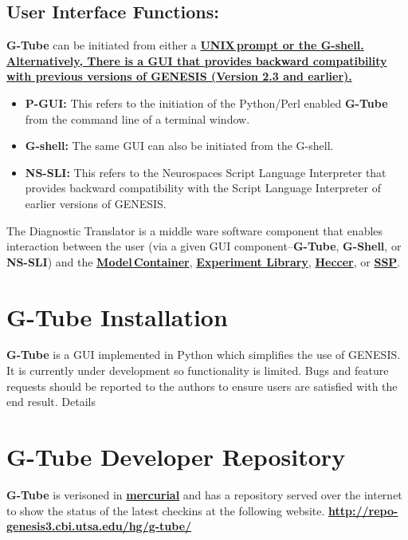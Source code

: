 \documentclass[12pt]{article}
\begin{document}
\subsection*{User Interface Functions:} {\bf G-Tube} can be initiated from either a \href{../unix-linux/unix-linux.tex}\bf {\bf UNIX\,prompt} or the \href{../gshell/gshell.tex}{\bf G-shell}. Alternatively, There is a GUI that provides backward compatibility with previous versions of GENESIS (Version 2.3 and earlier).

\begin{itemize}
   \item {\bf P-GUI:} This refers to the initiation of the Python/Perl enabled {\bf G-Tube} from the command line of a terminal window.
   \item {\bf G-shell:} The same GUI can also be initiated from the G-shell.
   \item {\bf NS-SLI:} This refers to the Neurospaces Script Language Interpreter that provides backward compatibility with the Script Language Interpreter of earlier versions of GENESIS.
\end{itemize}

The Diagnostic Translator is a middle ware software component that enables interaction between the user (via a given GUI component--{\bf G-Tube}, {\bf G-Shell}, or {\bf NS-SLI}) and the \href{../model-container/model-container.tex}{\bf Model\,Container}, \href{../experiment/experiment.tex}{\bf Experiment Library}, \href{../heccer/heccer.tex}{\bf Heccer}, or \href{../ssp/ssp.tex}{\bf SSP}.

\section*{G-Tube Installation}

{\bf G-Tube} is a GUI implemented in Python which simplifies the use of GENESIS. It is currently under development so functionality is limited. Bugs and feature requests should be reported to the authors to ensure users are satisfied with the end result.
Details

\section*{G-Tube Developer Repository}

{\bf G-Tube} is verisoned in \href{http://mercurial.selenic.com/}{\bf mercurial} and has a repository served over the internet to show the status of the latest checkins at the following website. \href{http://repo-genesis3.cbi.utsa.edu/hg/g-tube/}{\bf http://repo-genesis3.cbi.utsa.edu/hg/g-tube/}
\end{document}
